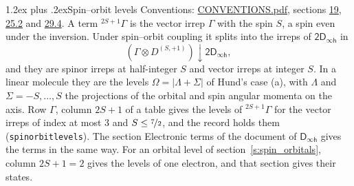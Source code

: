 \documentclass[10pt,a4paper]{article}
\makeatletter
\renewcommand\section{\@startsection{section}{1}{\z@}{-3ex plus -1ex minus -.2ex}%
  {1.2ex plus .2ex}{\normalfont\large\sffamily\bfseries\color{parttitle}}}
\numberwithin{equation}{section}
\newcommand{\grp}[1]{\mathsf{#1}}
\newcommand{\restr}[2]{#1\!\downarrow#2}
\newcommand{\irrJp}[2]{D^{(#1,#2)}}
\newcommand{\irrprod}{\otimes}
\newcommand{\term}[2]{{}^{#1}#2}
\makeatother
\begin{document}
\section{Spin--orbit levels}\label{s:spin_orbit}
Conventions: \href{../../CONVENTIONS.pdf}{CONVENTIONS.pdf}, sections \href{../../../rotation/CONVENTIONS.pdf\#conv.19}{19}, \href{../../CONVENTIONS.pdf\#conv.25.2}{25.2} and \href{../../CONVENTIONS.pdf\#conv.29.4}{29.4}.
\leavevmode\label{n:local.spin}\label{n:symbol.term}A term $\term{2S+1}{\Gamma}$ is the vector irrep $\Gamma$ with the spin $S$, a spin even under the inversion. Under spin--orbit coupling it splits into the irreps of $\grp{2D_{\infty h}}$ in
\begin{equation}\label{e:spinorbit}\restr{(\Gamma \irrprod \irrJp{S}{+1})}{\grp{2D_{\infty h}}},\end{equation}
and they are spinor irreps at half-integer $S$ and vector irreps at integer $S$. In a linear molecule they are the levels $\Omega = \lvert\Lambda + \Sigma\rvert$ of Hund's case (a), with $\Lambda$ and $\Sigma = -S, \dots, S$ the projections of the orbital and spin angular momenta on the axis. Row $\Gamma$, column $2S + 1$ of a table gives the levels of $\term{2S+1}{\Gamma}$ for the vector irreps of index at most 3 and $S \le \nicefrac{7}{2}$, and the record holds them (\texttt{spinorbitlevels}). The section Electronic terms of the document of \href{../../../rotation/data/pdf/Dinfh.pdf}{$\grp{D_{\infty h}}$} gives the terms in the same way. For an orbital level of section~\ref{s:spin_orbitals}, column $2S + 1 = 2$ gives the levels of one electron, and that section gives their states.
\end{document}

